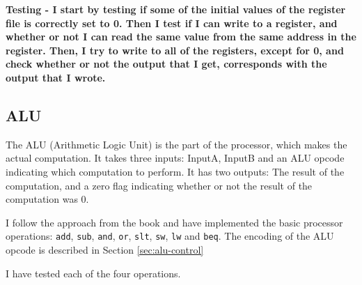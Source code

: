 \bf{Testing} - I start by testing if some of the initial values of the register
file is correctly set to 0. Then I test if I can write to a register, and
whether or not I can read the same value from the same address in the register.
Then, I try to write to all of the registers, except for 0, and check whether
or not the output that I get, corresponds with the output that I wrote.

\subsection{ALU}
The ALU (Arithmetic Logic Unit) is the part of the processor, which makes the
actual computation. It takes three inputs: InputA, InputB and an ALU opcode
indicating which computation to perform. It has two outputs: The result of the
computation, and a zero flag indicating whether or not the result of the
computation was 0.

I follow the approach from the book %
and have implemented the basic processor operations: \texttt{add}, \texttt{sub},
\texttt{and}, \texttt{or}, \texttt{slt}, \texttt{sw}, \texttt{lw} and
\texttt{beq}. The encoding of the ALU opcode is described in Section
\ref{sec:alu-control}

I have tested each of the four operations.

